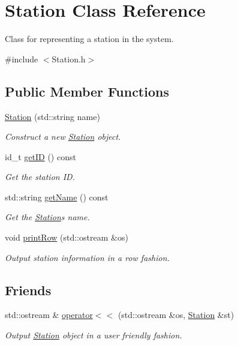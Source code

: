 \hypertarget{classStation}{}\section{Station Class Reference}
\label{classStation}


Class for representing a station in the system.  




{\ttfamily \#include $<$Station.\+h$>$}

\subsection*{Public Member Functions}
\begin{DoxyCompactItemize}
\item 
\mbox{\hyperlink{classStation_a53a471eb11c9431c3e89058d558f7601}{Station}} (std\+::string name)
\begin{DoxyCompactList}\small\item\em Construct a new \mbox{\hyperlink{classStation}{Station}} object. \end{DoxyCompactList}\item 
id\+\_\+t \mbox{\hyperlink{classStation_acbc5832d77cbe29c9006212b9cc32a42}{get\+ID}} () const
\begin{DoxyCompactList}\small\item\em Get the station ID. \end{DoxyCompactList}\item 
std\+::string \mbox{\hyperlink{classStation_ac823ae175ec0e2baff462ed9612c7bae}{get\+Name}} () const
\begin{DoxyCompactList}\small\item\em Get the \mbox{\hyperlink{classStation}{Station}}\textquotesingle{}s name. \end{DoxyCompactList}\item 
void \mbox{\hyperlink{classStation_a66c028cdffd79bddd0704235b051ff4e}{print\+Row}} (std\+::ostream \&os)
\begin{DoxyCompactList}\small\item\em Output station information in a row fashion. \end{DoxyCompactList}\end{DoxyCompactItemize}
\subsection*{Friends}
\begin{DoxyCompactItemize}
\item 
std\+::ostream \& \mbox{\hyperlink{classStation_ae5ca3266f8eead5634eb5926438392da}{operator$<$$<$}} (std\+::ostream \&os, \mbox{\hyperlink{classStation}{Station}} \&st)
\begin{DoxyCompactList}\small\item\em Output \mbox{\hyperlink{classStation}{Station}} object in a user friendly fashion. \end{DoxyCompactList}\end{DoxyCompactItemize}


